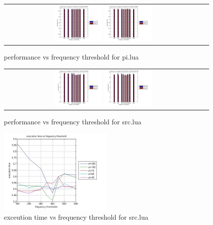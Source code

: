 \documentclass{sigplanconf}
\begin{document}
 \begin{figure}
	\centering
        \begin{tabular}{cc}
		    \includegraphics[width=0.25\textwidth]{pi_ft-time2.jpg}
		 	\includegraphics[width=0.25\textwidth]{pi_ft-time3.jpg}&
		\end{tabular}
	 \label{pi_ft_time}\caption{performance vs frequency threshold for pi.lua}
 \end{figure}

 \begin{figure}
	\centering
        \begin{tabular}{cc}
		 	\includegraphics[width=0.25\textwidth]{src_ft-time4.jpg}
        		\includegraphics[width=0.25\textwidth]{src_ft-time5.jpg}&
		\end{tabular}
	 \label{src_ft_time}\caption{performance vs frequency threshold for src.lua}
 \end{figure}
 \begin{figure}
	 \begin{center}
		 \includegraphics[width=0.5\textwidth]{src_analyser.jpg} 
	 \end{center}
	 \caption{exceution time vs frequency threshold for src.lua}
	 \label{src_ana}
 \end{figure}
 
\end{document}
